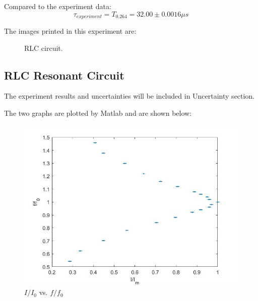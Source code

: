 \documentclass[12pt, a4paper]{article}
\begin{document}
Compared to the experiment data:
$$\tau_{experiment}=T_{0.264} = 32.00\pm0.0016\mu s$$

The images printed in this experiment are:
\begin{figure}[H]
	\centering
	\hspace{0.3in} 
	\hspace{0.3in}   
	\caption{RLC circuit.}
  \end{figure}
  
\subsection{RLC Resonant Circuit}
The experiment results and uncertainties will be included in Uncertainty section.

The two graphs are plotted by Matlab and are shown below:
\begin{figure}[H]
	\centering
	\includegraphics[scale = 0.4]{I_I0vsf_f0.jpg}
	\caption{$I/I_0$ vs. $f/f_0$}
\end{figure}
\end{document}
